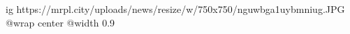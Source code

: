  
 
 
 
 

\ifcmt
  ig https://mrpl.city/uploads/news/resize/w/750x750/nguwbga1uybmniug.JPG
  @wrap center
  @width 0.9
\fi

